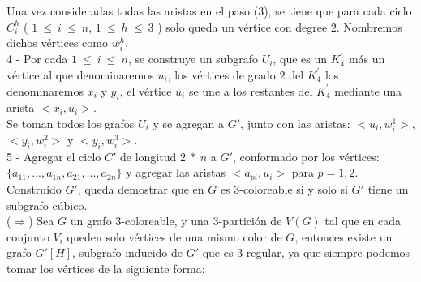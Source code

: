 \documentclass{article}
\begin{document}
Una vez consideradas todas las aristas en el paso (3), se tiene que para cada ciclo $C_i^h$ ( $1~\leq ~i ~\leq~ n$, $1~\leq ~h ~\leq~ 3$ )
solo queda un v\'ertice con degree $2$. Nombremos dichos v\'ertices como $w_i^h$.\\ 

4 - Por cada $1~\leq ~i ~\leq~ n$, se construye un subgrafo $U_i$, que es un $K^{'}_4$ m\'as un v\'ertice al que denominaremos $u_{i}$, los v\'ertices de grado $2$ del $K^{'}_4$
los denominaremos $x_{i}$ y $y_{i}$, el v\'ertice $u_i$ se une a los restantes del  $K^{'}_4$ mediante una arista $<x_{i},u_i>$.\\ 

Se toman todos los grafos $U_i$ y se agregan a $G'$, junto con las aristas: $<u_i, w_i^1>$, $<y_i, w_i^2>$ y $<y_i, w_i^3>$. \\

5 - Agregar el ciclo $C'$ de longitud $2~*~n$ a $G'$, conformado por los v\'ertices: $\{ a_{11}, ... , a_{1n}, a_{21}, ... , a_{2n} \}$ y agregar las aristas 
$<a_{pi}, u_{i}>$ para $p = 1,2$.\\

Construido $G'$, queda demostrar que en $G$ es $3$-coloreable si y solo si $G'$ tiene un subgrafo c\'ubico. \\ 

($\Rightarrow$) Sea $G$ un grafo $3$-coloreable, y una $3$-partici\'on de $V(G)$ tal que en cada conjunto $V_i$ queden solo v\'ertices de una mismo 
color de $G$, entonces existe un grafo $G'[H]$, subgrafo inducido de $G'$ que es $3$-regular, ya que siempre podemos tomar los v\'ertices de la siguiente forma:\\
\end{document}
